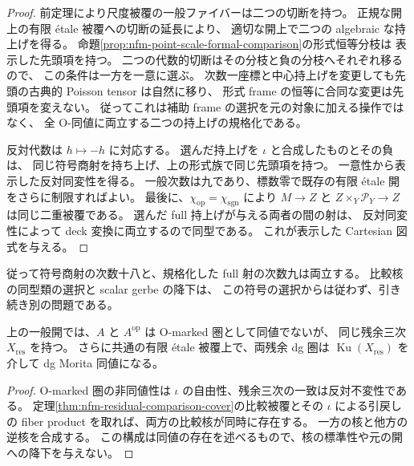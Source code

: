 \begin{proof}
前定理により尺度被覆の一般ファイバーは二つの切断を持つ。
正規な開上の有限 \'etale 被覆への切断の延長により、
適切な開上で二つの algebraic な持上げを得る。
命題\ref{prop:nfm-point-scale-formal-comparison}の形式恒等分枝は
表示した先頭項を持つ。
二つの代数的切断はその分枝と負の分枝へそれぞれ移るので、
この条件は一方を一意に選ぶ。
次数一座標と中心持上げを変更しても先頭の古典的 Poisson tensor は自然に移り、
形式 frame の恒等に合同な変更は先頭項を変えない。
従ってこれは補助 frame の選択を元の対象に加える操作ではなく、
全 O-同値に両立する二つの持上げの規格化である。

反対代数は $h\mapsto-h$ に対応する。
選んだ持上げを $\iota$ と合成したものとその負は、
同じ符号商射を持ち上げ、上の形式族で同じ先頭項を持つ。
一意性から表示した反対同変性を得る。
一般次数は九であり、標数零で既存の有限 \'etale 開をさらに制限すればよい。
最後に、$\chi_{\mathrm{op}}=\chi_{\mathrm{sgn}}$ により
$M\to Z$ と $Z\times_Y\mathcal P_Y\to Z$ は同じ二重被覆である。
選んだ full 持上げが与える両者の間の射は、
反対同変性によって deck 変換に両立するので同型である。
これが表示した Cartesian 図式を与える。
\end{proof}

従って符号商射の次数十八と、規格化した full 射の次数九は両立する。
比較核の同型類の選択と scalar gerbe の降下は、
この符号の選択からは従わず、引き続き別の問題である。


\begin{corollary}
\label{cor:nfm-opposite-same-residual-category}
上の一般開では、$A$ と $A^{\mathrm{op}}$ は O-marked 圏として同値でないが、
同じ残余三次 $X_{\mathrm{res}}$ を持つ。
さらに共通の有限 \'etale 被覆上で、両残余 dg 圏は
$\operatorname{Ku}(X_{\mathrm{res}})$ を介して dg Morita 同値になる。
\end{corollary}

\begin{proof}
O-marked 圏の非同値性は $\iota$ の自由性、残余三次の一致は反対不変性である。
定理\ref{thm:nfm-residual-comparison-cover}の比較被覆とその
$\iota$ による引戻しの fiber product を取れば、両方の比較核が同時に存在する。
一方の核と他方の逆核を合成する。
この構成は同値の存在を述べるもので、核の標準性や元の開への降下を与えない。
\end{proof}

